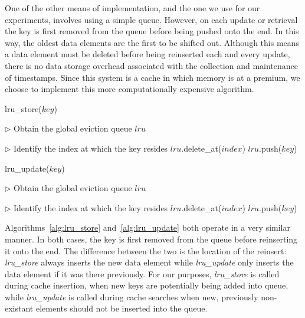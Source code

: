 One of the other means of implementation, and the one we use for our
experiments, involves using a simple queue. However, on each update or
retrieval the key is first removed from the queue before being pushed onto the
end. In this way, the oldest data elements are the first to be shifted out.
Although this means a data element must be deleted before being reinserted each
and every update, there is no data storage overhead associated with the
collection and maintenance of timestamps. Since this system is a cache in which
memory is at a premium, we choose to implement this more computationally
expensive algorithm.

\begin{algorithm}[htp]
\small
\caption{\label{alg:lru_store}lru\_store($key$)}
\begin{algorithmic}[1]
\STATE $\triangleright$ Obtain the global eviction queue $lru$

\STATE $\triangleright$ Identify the index at which the key resides
  \STATE $lru$.delete\_at($index$)
\ENDIF
\STATE $lru$.push($key$)
\end{algorithmic}
\end{algorithm}

\begin{algorithm}[htp]
\small
\caption{\label{alg:lru_update}lru\_update($key$)}
\begin{algorithmic}[1]
\STATE $\triangleright$ Obtain the global eviction queue $lru$

\STATE $\triangleright$ Identify the index at which the key resides
  \STATE $lru$.delete\_at($index$)
  \STATE $lru$.push($key$)
\ENDIF
\end{algorithmic}
\end{algorithm}

Algorithms~\ref{alg:lru_store} and~\ref{alg:lru_update} both operate in a very
similar manner. In both cases, the key is first removed from the queue before
reinserting it onto the end. The difference between the two is the location of
the reinsert: \emph{lru\_store} always inserts the new data element while
\emph{lru\_update} only inserts the data element if it was there previously.
For our purposes, \emph{lru\_store} is called during cache insertion, when new
keys are potentially being added into queue, while \emph{lru\_update} is called
during cache searches when new, previously non-existant elements should not be
inserted into the queue.


